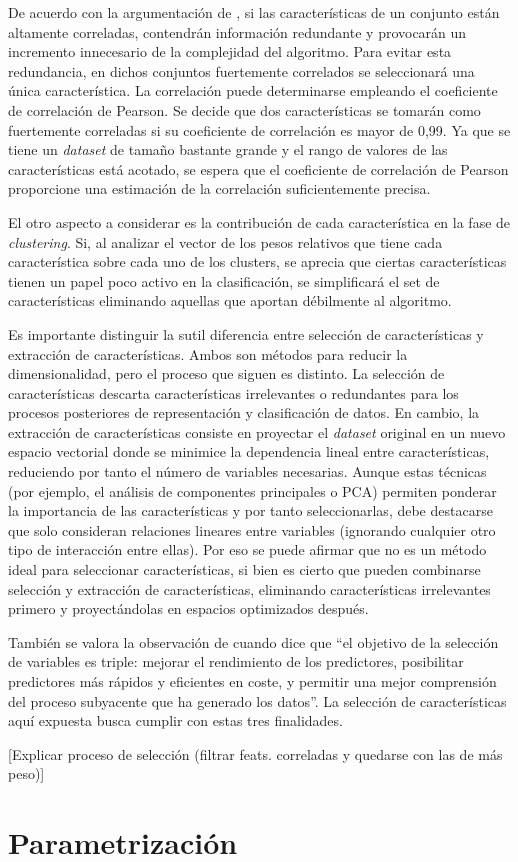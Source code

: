 De acuerdo con la argumentación de \cite{Bohara_2016}, si las características de un conjunto están altamente correladas,
contendrán información redundante y provocarán un incremento innecesario de la complejidad del algoritmo.
Para evitar esta redundancia, en dichos conjuntos fuertemente correlados se seleccionará una única característica.
La correlación puede determinarse empleando el coeficiente de correlación de Pearson.
Se decide que dos características se tomarán como fuertemente correladas si su coeficiente de correlación es mayor de 0,99.
Ya que se tiene un \emph{dataset} de tamaño bastante grande y el rango de valores de las características está acotado,
se espera que el coeficiente de correlación de Pearson proporcione una estimación de la correlación suficientemente precisa.

El otro aspecto a considerar es la contribución de cada característica en la fase de \emph{clustering}.
Si, al analizar el vector de los pesos relativos que tiene cada característica sobre cada uno de los clusters,
se aprecia que ciertas características tienen un papel poco activo en la clasificación,
se simplificará el set de características eliminando aquellas que aportan débilmente al algoritmo.

Es importante distinguir la sutil diferencia entre selección de características y extracción de características.
Ambos son métodos para reducir la dimensionalidad, pero el proceso que siguen es distinto.
La selección de características descarta características irrelevantes o redundantes para los procesos posteriores de representación y clasificación de datos.
En cambio, la extracción de características consiste en proyectar el \emph{dataset} original en un nuevo espacio vectorial
donde se minimice la dependencia lineal entre características, reduciendo por tanto el número de variables necesarias.
Aunque estas técnicas (por ejemplo, el análisis de componentes principales o PCA) permiten ponderar la importancia de las características y por tanto seleccionarlas,
debe destacarse que solo consideran relaciones lineares entre variables (ignorando cualquier otro tipo de interacción entre ellas).
Por eso se puede afirmar que no es un método ideal para seleccionar características, si bien es cierto
que pueden combinarse selección y extracción de características, eliminando características irrelevantes primero y proyectándolas en espacios optimizados después.

También se valora la observación de \cite{Guyon_2003} cuando dice que ``el objetivo de la selección de variables es triple: mejorar el rendimiento de los predictores, posibilitar predictores más rápidos y eficientes en coste, y permitir una mejor comprensión del proceso subyacente que ha generado los datos''.
La selección de características aquí expuesta busca cumplir con estas tres finalidades.

[Explicar proceso de selección (filtrar feats. correladas y quedarse con las de más peso)]

\section{Parametrización}\label{sec:parametrizacion}
